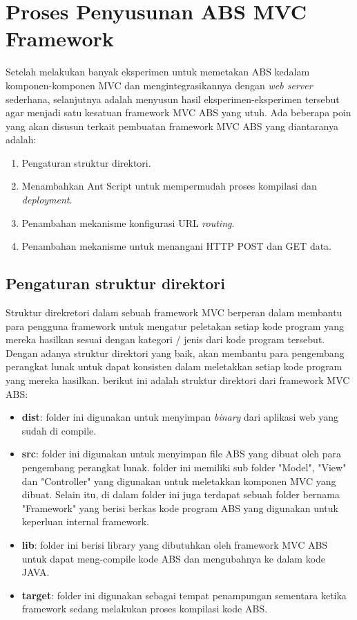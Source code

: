 \chapter{Proses Penyusunan ABS MVC Framework}

Setelah melakukan banyak eksperimen untuk memetakan ABS kedalam komponen-komponen MVC dan mengintegrasikannya dengan \textit{web server} sederhana, selanjutnya adalah menyusun hasil eksperimen-eksperimen tersebut agar menjadi satu kesatuan framework MVC ABS yang utuh. Ada beberapa poin yang akan disusun terkait pembuatan framework MVC ABS yang diantaranya adalah:

\begin{enumerate}
    \item Pengaturan struktur direktori.
    \item Menambahkan Ant Script untuk mempermudah proses kompilasi dan \textit{deployment}.
    \item Penambahan mekanisme konfigurasi URL \textit{routing}.
    \item Penambahan mekanisme untuk menangani HTTP POST dan GET data.
\end{enumerate}

\section{Pengaturan struktur direktori}

Struktur direkretori dalam sebuah framework MVC berperan dalam membantu para pengguna framework untuk mengatur peletakan setiap kode program yang mereka hasilkan sesuai dengan kategori / jenis dari kode program tersebut. Dengan adanya struktur direktori yang baik, akan membantu para pengembang perangkat lunak untuk dapat konsisten dalam meletakkan setiap kode program yang mereka hasilkan. berikut ini adalah struktur direktori dari framework MVC ABS:

\begin{itemize}
    \item \textbf{dist}: folder ini digunakan untuk menyimpan \textit{binary} dari aplikasi web yang sudah di compile.
    \item \textbf{src}: folder ini digunakan untuk menyimpan file ABS yang dibuat oleh para pengembang perangkat lunak. folder ini memiliki sub folder "Model", "View" dan "Controller" yang digunakan untuk meletakkan komponen MVC yang dibuat. Selain itu, di dalam folder ini juga terdapat sebuah folder bernama "Framework" yang berisi berkas kode program ABS yang digunakan untuk keperluan internal framework.
    \item \textbf{lib}: folder ini berisi library yang dibutuhkan oleh framework MVC ABS untuk dapat meng-compile kode ABS dan mengubahnya ke dalam kode JAVA.
    \item \textbf{target}: folder ini digunakan sebagai tempat penampungan sementara ketika framework sedang melakukan proses kompilasi kode ABS.
\end{itemize}

